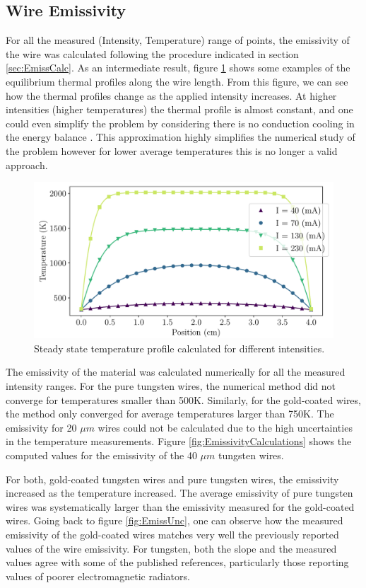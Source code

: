 \subsection{Wire Emissivity}

For all the measured (Intensity, Temperature) range of points, the emissivity of the wire was calculated following the procedure indicated in section \ref{sec:EmissCalc}. As an intermediate result, figure \ref{fig:ThermalProfile} shows some examples of the equilibrium thermal profiles along the wire length. From this figure, we can see how the thermal profiles change as the applied intensity increases. At higher intensities (higher temperatures) the thermal profile is almost constant, and one could even simplify the problem by considering there is no conduction cooling in the energy balance \parencite[]{ref:tungstenemissi}. This approximation highly simplifies the numerical study of the problem however for lower average temperatures this is no longer a valid approach. 

\begin{figure}[h!]
    \centering
    \includegraphics[width=0.75\columnwidth]{TempProf/TempProfPlot.pdf}
    \caption{Steady state temperature profile calculated for different intensities.}
    \label{fig:ThermalProfile}
\end{figure}

The emissivity of the material was calculated numerically for all the measured intensity ranges. For the pure tungsten wires, the numerical method did not converge for temperatures smaller than 500K. Similarly, for the gold-coated wires, the method only converged for average temperatures larger than 750K. The emissivity for 20 $\mu m$ wires could not be calculated due to the high uncertainties in the temperature measurements. Figure \ref{fig:EmissivityCalculations} shows the computed values for the emissivity of the 40 $\mu m$ tungsten wires. 

For both, gold-coated tungsten wires and pure tungsten wires, the emissivity increased as the temperature increased. The average emissivity of pure tungsten wires was systematically larger than the emissivity measured for the gold-coated wires. Going back to figure \ref{fig:EmissUnc}, one can observe how the measured emissivity of the gold-coated wires matches very well the previously reported values of the wire emissivity. For tungsten, both the slope and the measured values agree with some of the published references, particularly those reporting values of poorer electromagnetic radiators. 

